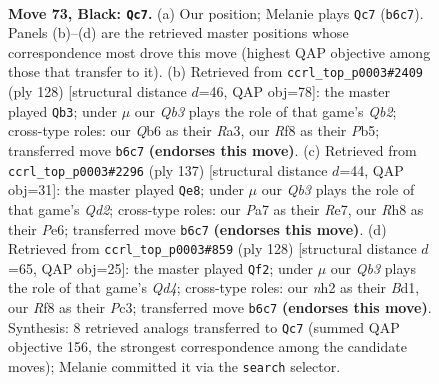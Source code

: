 \documentclass[11pt]{article}
\begin{document}
\clearpage

\begin{figure}[p]\centering
\begin{subfigure}{0.46\textwidth}\centering
\resizebox{\linewidth}{!}{%
\newchessgame
\chessboard[
  setfen={5r1r/pk1Q2p1/1q5p/3p3P/3P2P1/4P3/7N/4b2K b - - 2 73},
  showmover=false,
  pgfstyle=straightmove, color=movearrow, markmove={b6-c7}
]}
\caption{}
\end{subfigure}\hfill
\begin{subfigure}{0.46\textwidth}\centering
\resizebox{\linewidth}{!}{%
\newchessgame
\chessboard[
  setfen={5rk1/8/1pP1p1pP/1P2p3/2qpP3/R4P2/KQ6/8 w - - 2 65},
  showmover=false,
  pgfstyle=straightmove, color=movearrow, markmove={b2-b3}
]}
\caption{}
\end{subfigure}
\\[4pt]
\begin{subfigure}{0.46\textwidth}\centering
\resizebox{\linewidth}{!}{%
\newchessgame
\chessboard[
  setfen={1Q4k1/3qr3/4p3/1p3pN1/p6P/P2P2P1/1P3P1K/8 b - - 26 69},
  showmover=false,
  pgfstyle=straightmove, color=movearrow, markmove={d7-e8}
]}
\caption{}
\end{subfigure}\hfill
\begin{subfigure}{0.46\textwidth}\centering
\resizebox{\linewidth}{!}{%
\newchessgame
\chessboard[
  setfen={8/6k1/2p1p1p1/P1n1P2p/3Q3P/2P3P1/q5K1/3B4 w - - 1 65},
  showmover=false,
  pgfstyle=straightmove, color=movearrow, markmove={d4-f2}
]}
\caption{}
\end{subfigure}
\caption{\textbf{Move 73, Black: \texttt{Qc7}.} (a) Our position; Melanie plays \texttt{Qc7} (\texttt{b6c7}). Panels (b)--(d) are the retrieved master positions whose correspondence most drove this move (highest QAP objective among those that transfer to it). (b) Retrieved from \texttt{ccrl\_top\_p0003\#2409} (ply 128) [structural distance $d$=46, QAP obj=78]: the master played \texttt{Qb3}; under $\mu$ our \emph{Qb3} plays the role of that game's \emph{Qb2}; cross-type roles: our \emph{Q}b6 as their \emph{R}a3, our \emph{R}f8 as their \emph{P}b5; transferred move \texttt{b6c7} \textbf{(endorses this move)}. (c) Retrieved from \texttt{ccrl\_top\_p0003\#2296} (ply 137) [structural distance $d$=44, QAP obj=31]: the master played \texttt{Qe8}; under $\mu$ our \emph{Qb3} plays the role of that game's \emph{Qd2}; cross-type roles: our \emph{P}a7 as their \emph{R}e7, our \emph{R}h8 as their \emph{P}e6; transferred move \texttt{b6c7} \textbf{(endorses this move)}. (d) Retrieved from \texttt{ccrl\_top\_p0003\#859} (ply 128) [structural distance $d$=65, QAP obj=25]: the master played \texttt{Qf2}; under $\mu$ our \emph{Qb3} plays the role of that game's \emph{Qd4}; cross-type roles: our \emph{n}h2 as their \emph{B}d1, our \emph{R}f8 as their \emph{P}c3; transferred move \texttt{b6c7} \textbf{(endorses this move)}. Synthesis: 8 retrieved analogs transferred to \texttt{Qc7} (summed QAP objective 156, the strongest correspondence among the candidate moves); Melanie committed it via the \texttt{search} selector.}
\label{fig:thought-m145}
\end{figure}
\end{document}
